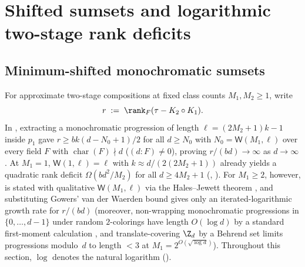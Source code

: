 \section{Shifted sumsets and logarithmic two-stage rank deficits}\label{sec:sumsets}

\subsection{Minimum-shifted monochromatic sumsets}\label{sec:sumsets-step1}

For approximate two-stage compositions at fixed class counts $M_1, M_2 \ge 1$, write
\[
  r \;:=\; \rank_F(\tau - K_2 \circ K_1).
\]
In \cite[Theorem~6.6]{SharedDecoders2026}, extracting a monochromatic progression of length
$\ell = (2M_2 + 1)k - 1$ inside $p_1$ gave $r \ge bk(d - N_0 + 1)/2$ for all $d \ge N_0$ with
$N_0 = \mathsf{W}(M_1, \ell)$ over every field $F$ with $\operatorname{char}(F) \nmid d$
($(d : F) \ne 0$), proving $r/(bd) \to \infty$ as $d \to \infty$. At $M_1 = 1$,
$\mathsf{W}(1, \ell) = \ell$ with $k \approx d/(2(2M_2 + 1))$ already yields a quadratic rank deficit
$\Omega(bd^2 / M_2)$ for all $d \ge 4M_2 + 1$ (\cite[Theorem~6.6]{SharedDecoders2026},
). For $M_1 \ge 2$, however,
\cite[Theorem~6.6]{SharedDecoders2026} is stated with qualitative $\mathsf{W}(M_1, \ell)$ via the
Hales--Jewett theorem \cite{HalesJewett1963}, and substituting Gowers' van der Waerden bound
\cite{Gowers2001} gives only an iterated-logarithmic growth rate for $r/(bd)$ (moreover, non-wrapping
monochromatic progressions in $\{0, \dots, d-1\}$ under random $2$-colorings have length $O(\log d)$
by a standard first-moment calculation \cite{GRS1990,AlonSpencer2016}, and translate-covering $\Z_d$
by a Behrend set \cite{Behrend1946} limits progressions modulo~$d$ to length $< 3$ at
$M_1 = 2^{O(\sqrt{\log d})}$). Throughout this section, $\log$ denotes the natural logarithm
().

